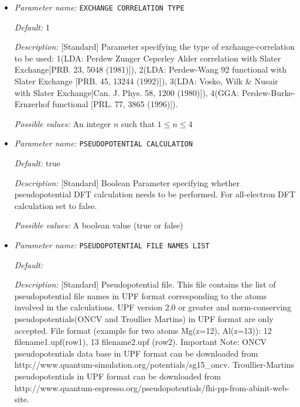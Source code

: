\begin{itemize}
\item {\it Parameter name:} {\tt EXCHANGE CORRELATION TYPE}
\label{parameters:DFT functional parameters/EXCHANGE CORRELATION TYPE}
\label{parameters:DFT_20functional_20parameters/EXCHANGE_20CORRELATION_20TYPE}




{\it Default:} 1


{\it Description:} [Standard] Parameter specifying the type of exchange-correlation to be used: 1(LDA: Perdew Zunger Ceperley Alder correlation with Slater Exchange[PRB. 23, 5048 (1981)]), 2(LDA: Perdew-Wang 92 functional with Slater Exchange [PRB. 45, 13244 (1992)]), 3(LDA: Vosko, Wilk \& Nusair with Slater Exchange[Can. J. Phys. 58, 1200 (1980)]), 4(GGA: Perdew-Burke-Ernzerhof functional [PRL. 77, 3865 (1996)]).


{\it Possible values:} An integer $n$ such that $1\leq n \leq 4$
\item {\it Parameter name:} {\tt PSEUDOPOTENTIAL CALCULATION}
\label{parameters:DFT functional parameters/PSEUDOPOTENTIAL CALCULATION}
\label{parameters:DFT_20functional_20parameters/PSEUDOPOTENTIAL_20CALCULATION}




{\it Default:} true


{\it Description:} [Standard] Boolean Parameter specifying whether pseudopotential DFT calculation needs to be performed. For all-electron DFT calculation set to false.


{\it Possible values:} A boolean value (true or false)
\item {\it Parameter name:} {\tt PSEUDOPOTENTIAL FILE NAMES LIST}
\label{parameters:DFT functional parameters/PSEUDOPOTENTIAL FILE NAMES LIST}
\label{parameters:DFT_20functional_20parameters/PSEUDOPOTENTIAL_20FILE_20NAMES_20LIST}




{\it Default:} 


{\it Description:} [Standard] Pseudopotential file. This file contains the list of pseudopotential file names in UPF format corresponding to the atoms involved in the calculations. UPF version 2.0 or greater and norm-conserving pseudopotentials(ONCV and Troullier Martins) in UPF format are only accepted. File format (example for two atoms Mg(z=12), Al(z=13)): 12 filename1.upf(row1), 13 filename2.upf (row2). Important Note: ONCV pseudopotentials data base in UPF format can be downloaded from http://www.quantum-simulation.org/potentials/sg15\_oncv.  Troullier-Martins pseudopotentials in UPF format can be downloaded from http://www.quantum-espresso.org/pseudopotentials/fhi-pp-from-abinit-web-site.



\end{itemize}
